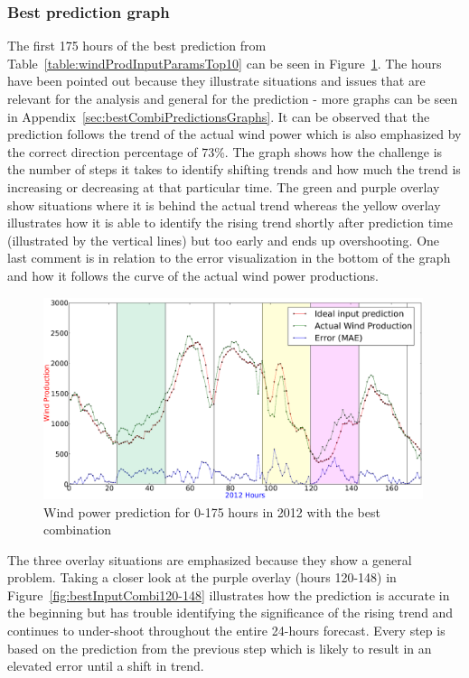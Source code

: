 \subsubsection{Best prediction graph}
\label{sec:bestInputCombiGraph}
The first 175 hours of the best prediction from Table~\ref{table:windProdInputParamsTop10} can be seen in Figure~\ref{fig:bestInputParameterPrediction}. The hours have been pointed out because they illustrate situations and issues that are relevant for the analysis and general for the prediction - more graphs can be seen in Appendix~\ref{sec:bestCombiPredictionsGraphs}. It can be observed that the prediction follows the trend of the actual wind power which is also emphasized by the correct direction percentage of 73\%. The graph shows how the challenge is the number of steps it takes to identify shifting trends and how much the trend is increasing or decreasing at that particular time. The green and purple overlay show situations where it is behind the actual trend whereas the yellow overlay illustrates how it is able to identify the rising trend shortly after prediction time (illustrated by the vertical lines) but too early and ends up overshooting. One last comment is in relation to the error visualization in the bottom of the graph and how it follows the curve of the actual wind power productions.  

\begin{figure}[ht!]
\centering
\includegraphics[width=0.99\textwidth]{billeder/bestInputParameterPrediction.png}
\caption{Wind power prediction for 0-175 hours in 2012 with the best combination}
\label{fig:bestInputParameterPrediction}
\end{figure} 

The three overlay situations are emphasized because they show a general problem. Taking a closer look at the purple overlay (hours 120-148) in Figure~\ref{fig:bestInputCombi120-148} illustrates how the prediction is accurate in the beginning but has trouble identifying the significance of the rising trend and continues to under-shoot throughout the entire 24-hours forecast. Every step is based on the prediction from the previous step which is likely to result in an elevated error until a shift in trend.

